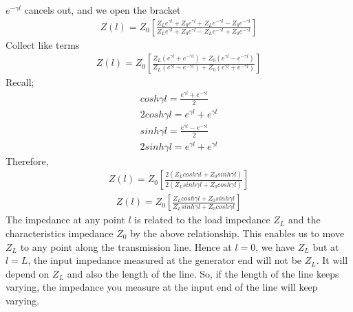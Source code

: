 $e^{-\gamma l}$ cancels out, and we open the bracket
\begin{align*}
Z(l) = Z_0 \left[\frac{Z_Le^{\gamma l} + Z_0e^{\gamma l} + Z_Le^{-\gamma l} - Z_0e^{-\gamma l}}{Z_L e^{\gamma l} + Z_0e^{\gamma l} - Z_Le^{-\gamma l} + Z_0e^{-\gamma l}}\right]
\end{align*}
Collect like terms
\begin{align*}
Z(l) = Z_0 \left[\frac{Z_L(e^{\gamma l} + e^{-\gamma l}) + Z_0(e^{\gamma l} - e^{-\gamma l})}{Z_L (e^{\gamma l} - e^{-\gamma l}) + Z_0(e^{\gamma l} + e^{-\gamma l})}\right]
\end{align*}
Recall; 
\begin{align*}
cosh\gamma l = \frac{e^{\gamma l} + e^{-\gamma l}}{2}\\
2cosh\gamma l = e^{\gamma l} + e^{\gamma l}
\end{align*}
\begin{align*}
sinh\gamma l = \frac{e^{\gamma l} - e^{-\gamma l}}{2}\\
2sinh\gamma l = e^{\gamma l} + e^{\gamma l}
\end{align*}
Therefore,
\begin{align*}
Z(l) = Z_0\left[\frac{2(Z_Lcosh\gamma l + Z_0sinh\gamma l)}{2(Z_Lsinh\gamma l + Z_0cosh\gamma l)}\right]
\end{align*}
\begin{align}
Z(l) = Z_0\left[\frac{Z_Lcosh\gamma l + Z_0sinh\gamma l}{Z_Lsinh\gamma l + Z_0cosh\gamma l}\right]
\label{eqn:imp}
\end{align}
The impedance at any point $l$ is related to the load impedance $Z_L$ and the characteristics impedance $Z_0$ by the above relationship. This enables us to move $Z_L$ to any point along the transmission line. Hence at $l = 0$, we have $Z_L$ but at $l = L$, the input impedance measured at the generator end will not be $Z_L$. It will depend on $Z_L$ and also the length of the line. So, if the length of the line keeps varying, the impedance you measure at the input end of the line will keep varying. 


